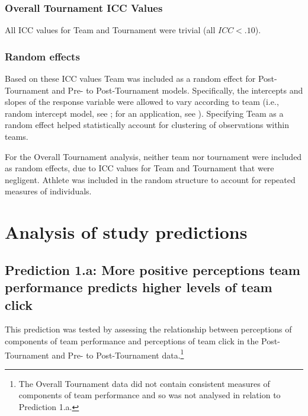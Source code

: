 \begin{CJK}{UTF8}{gbsn}
\subsubsection{Overall Tournament ICC Values}
All ICC values for Team and Tournament were trivial (all $ICC < .10$).

\subsubsection{Random effects}
Based on these ICC values Team was included as a random effect for Post-Tournament and Pre- to Post-Tournament models.
Specifically, the intercepts and slopes of the response variable were allowed to vary according to team (i.e., random intercept model, see \textcite{Pinheiro2000}; for an application, see \textcite{Oberauer2006}).
Specifying Team as a random effect helped statistically account for clustering of observations within teams.

For the Overall Tournament analysis, neither team nor tournament were included as random effects, due to ICC values for Team and Tournament that were negligent.  Athlete was included in the random structure to account for repeated measures of individuals.















\clearpage




\section{Analysis of study predictions}




\subsection{Prediction 1.a: More positive perceptions team performance predicts higher levels of team click\label{sect:prediction1a}}

This prediction was tested by assessing the relationship between perceptions of components of team performance and perceptions of team click in the Post-Tournament and Pre- to Post-Tournament data.\footnote{The Overall Tournament data did not contain consistent measures of components of team performance and so was not analysed in relation to Prediction 1.a.}


\end{CJK}
